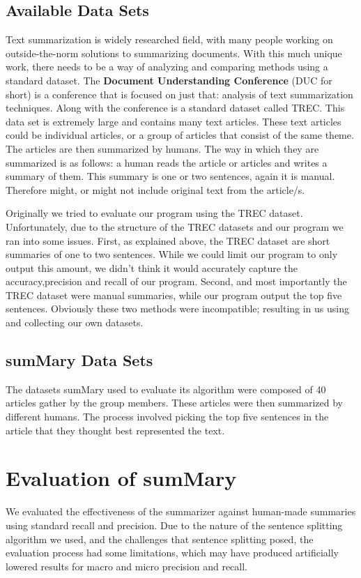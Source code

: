\documentclass[11pt,a4paper]{article}
\begin{document}
  \subsection{Available Data Sets}

  Text summarization is widely researched field, with many people working on outside-the-norm solutions to summarizing documents. With this much unique work, there needs to be a way of analyzing and comparing methods using a standard dataset. The \textbf{Document Understanding Conference} (DUC for short) is a conference that is focused on just that: analysis of text summarization techniques. Along with the conference is a standard dataset called TREC. This data set is extremely large and contains many text articles. These text articles could be individual articles, or a group of articles that consist of the same theme. The articles are then summarized by humans. The way in which they are summarized is as follows: a human reads the article or articles and writes a summary of them. This summary is one or two sentences, again it is manual. Therefore might, or might not include original text from the article/s.

  Originally we tried to evaluate our program using the TREC dataset. Unfortunately, due to the structure of the TREC datasets and our program we ran into some issues. First, as explained above, the TREC dataset are short summaries of one to two sentences. While we could limit our program to only output this amount, we didn't think it would accurately capture the accuracy,precision and recall of our program. Second, and most importantly the TREC dataset were manual summaries, while our program output the top five sentences. Obviously these two methods were incompatible; resulting in us using and collecting our own datasets.

  \subsection{sumMary Data Sets}

  The datasets sumMary used to evaluate its algorithm were composed of 40 articles gather by the group members. These articles were then summarized by different humans. The process involved picking the top five sentences in the article that they thought best represented the text.


  \section{Evaluation of sumMary}
  We evaluated the effectiveness of the summarizer against human-made summaries using standard recall and precision. Due to the nature of the sentence splitting algorithm we used, and the challenges that sentence splitting posed, the evaluation process had some limitations, which may have produced artificially lowered results for macro and micro precision and recall.
\end{document}
